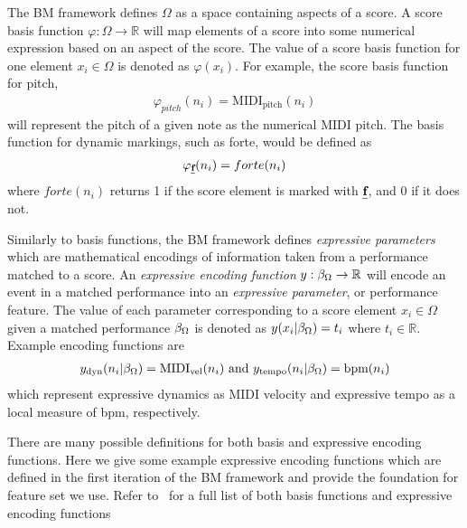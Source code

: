 The BM framework defines $\Omega$ as a space containing aspects of a score. A score basis function $\varphi: \Omega \rightarrow \mathbb{R}$ will map elements of a score into some numerical expression based on an aspect of the score. The value of a score basis function for one element $x_i \in \Omega$ is denoted as $\varphi (x_i)$. For example, the score basis function for pitch, 
\begin{align*}
\varphi_{pitch} (n_i) = \textrm{MIDI}_{\textrm{pitch}}(n_i)   
\end{align*}
will represent the pitch of a given note as the numerical MIDI pitch. The basis function for dynamic markings, such as forte, would be defined as 
\begin{align*}
\varphi_{\textbf{\emph{f}}} (n_i) = forte(n_i)   
\end{align*}
where $forte(n_i)$ returns 1 if the score element is marked with $\textbf{\emph{f}}$, and 0 if it does not. 

Similarly to basis functions, the BM framework defines \emph{expressive parameters} which are mathematical encodings of information taken from a performance matched to a score. An \emph{expressive encoding function} $y: \beta_{\Omega} \rightarrow \mathbb{R}$ will encode an event in a matched performance into an \emph{expressive parameter}, or performance feature. The value of each parameter corresponding to a score element $x_{i} \in \Omega$ given a matched performance $\beta_{\Omega}$ is denoted as $y(x_i \vert \beta_{\Omega}) = t_i$ where $t_i \in \mathbb{R}$. Example encoding functions are 
\begin{align*}
y_{\textrm{dyn}}(n_i \vert \beta_{\Omega}) = \textrm{MIDI}_{\textrm{vel}}(n_i) \textrm{ and } y_{\textrm{tempo}}(n_i \vert \beta_{\Omega}) = \textrm{bpm}(n_i)
\end{align*}
which represent expressive dynamics as MIDI velocity and expressive tempo as a local measure of bpm, respectively. 

There are many possible definitions for both basis and expressive encoding functions. Here we give some example expressive encoding functions which are defined in the first iteration of the BM framework and provide the foundation for feature set we use. Refer to~\citet{eduardo2018computational} for a full list of both basis functions and expressive encoding functions


